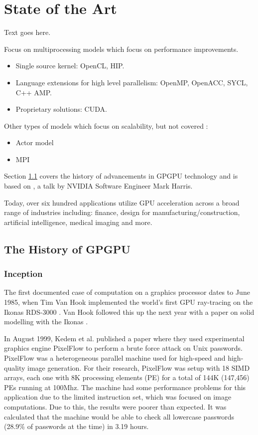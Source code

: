 \chapter{State of the Art}

Text goes here.

Focus on multiprocessing models which focus on performance improvements.

\begin{itemize}
    \item Single source kernel: OpenCL, HIP.
    \item Language extensions for high level parallelism: OpenMP, OpenACC, SYCL, C++ AMP.
    \item Proprietary solutions: CUDA.
\end{itemize}

Other types of models which focus on scalability, but not covered \cite{survey_programming_models}:

\begin{itemize}
    \item Actor model
    \item MPI
\end{itemize}

Section \ref{sect:history-gpgpu} covers the history of advancements in GPGPU technology and is based on \cite{brief_history_gpgpu}, a talk by NVIDIA Software Engineer Mark Harris.

Today, over six hundred applications utilize GPU acceleration across a broad range of industries including: finance, design for manufacturing/construction, artificial intelligence, medical imaging and more.

\section{The History of GPGPU} \label{sect:history-gpgpu}

\subsection{Inception}
The first documented case of computation on a graphics processor dates to June 1985, when Tim Van Hook implemented the world's first GPU ray-tracing on the Ikonas RDS-3000 \cite{ikonas}. Van Hook followed this up the next year with a paper on solid modelling with the Ikonas \cite{solid_modeling_ikonas}.

In August 1999, Kedem et al. \cite{unix_passwords_gpgpu} published a paper where they used experimental graphics engine PixelFlow to perform a brute force attack on Unix passwords. PixelFlow was a heterogeneous parallel machine used for high-speed and high-quality image generation. For their research, PixelFlow was setup with 18 SIMD arrays, each one with 8K processing elements (PE) for a total of 144K (147,456) PEs running at 100Mhz. The machine had some performance problems for this application due to the limited instruction set, which was focused on image computations. Due to this, the results were poorer than expected. It was calculated that the machine would be able to check all lowercase passwords (28.9\% of passwords at the time) in 3.19 hours.

